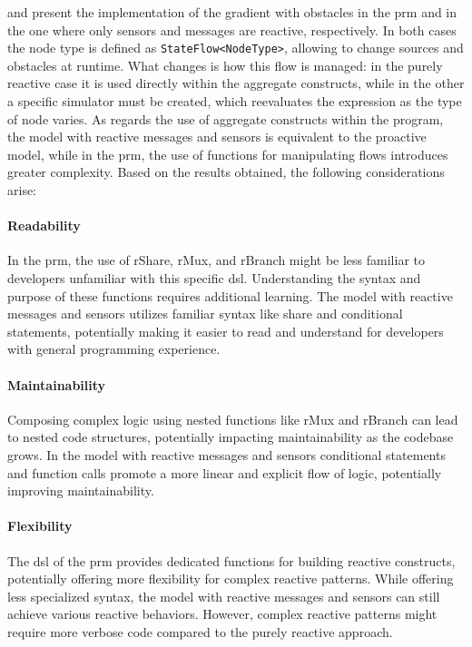  and  present the implementation of the gradient with obstacles in the \ac{prm} and in the one where only sensors and messages are reactive, respectively. In both cases the node type is defined as \texttt{StateFlow<NodeType>}, allowing to change sources and obstacles at runtime. What changes is how this flow is managed: in the purely reactive case it is used directly within the aggregate constructs, while in the other a specific simulator must be created, which reevaluates the expression as the type of node varies. As regards the use of aggregate constructs within the program, the model with reactive messages and sensors is equivalent to the proactive model, while in the \ac{prm}, the use of functions for manipulating flows introduces greater complexity. Based on the results obtained, the following considerations arise:


\paragraph{Readability}

In the \ac{prm}, the use of rShare, rMux, and rBranch might be less familiar to developers unfamiliar with this specific \ac{dsl}. Understanding the syntax and purpose of these functions requires additional learning. The model with reactive messages and sensors utilizes familiar syntax like share and conditional statements, potentially making it easier to read and understand for developers with general programming experience.

\paragraph{Maintainability}

Composing complex logic using nested functions like rMux and rBranch can lead to nested code structures, potentially impacting maintainability as the codebase grows. In the model with reactive messages and sensors conditional statements and function calls promote a more linear and explicit flow of logic, potentially improving maintainability.

\paragraph{Flexibility}

The \ac{dsl} of the \ac{prm} provides dedicated functions for building reactive constructs, potentially offering more flexibility for complex reactive patterns. While offering less specialized syntax, the model with reactive messages and sensors can still achieve various reactive behaviors. However, complex reactive patterns might require more verbose code compared to the purely reactive approach.

